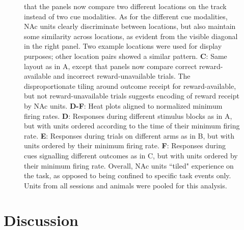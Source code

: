 \documentclass[11pt]{article}
\newcommand{\bsf}[1]{\textbf{#1}}
\providecommand{\DIFaddendFL}{} %
\DeclareRobustCommand{\DIFaddendFL}{\DIFOaddendFL \let\includegraphics\DIFOincludegraphics} %
\begin{document}
\begin{figure}[ht!]
{that the panels now compare two different locations on the track instead of
two cue modalities. As for the different cue modalities, NAc units clearly
discriminate between locations, but also maintain some similarity across
locations, as evident from the visible diagonal in the right panel. Two
example locations were used for display purposes; other location pairs showed
a similar pattern. \bsf{C}: Same layout as in A, except that panels now compare
correct reward-available and incorrect reward-unavailable trials. The disproportionate tiling around outcome receipt for reward-available, but not reward-unavailable
trials suggests encoding of reward receipt by NAc units. \bsf{D-F}: Heat plots aligned to normalized minimum firing rates. \bsf{D}: Responses during different stimulus blocks as in A, but with units ordered according to
the time of their minimum firing rate. \bsf{E}: Responses during trials on different arms as in B, but with units ordered by their minimum
firing rate. \bsf{F}: Responses during cues signalling different outcomes as in C, but with units ordered by their minimum firing
rate. Overall, NAc units ``tiled" experience on the task, as opposed to being
confined to specific task events only. Units from all sessions and animals
were pooled for this analysis.}
\DIFaddendFL \label{fig:NP_tiling}
\end{figure} \clearpage

\section*{Discussion}
\end{document}
